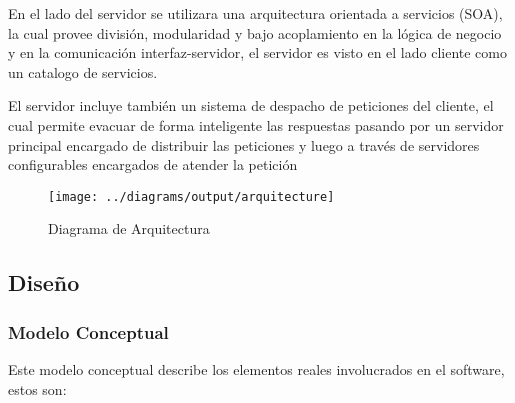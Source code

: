 En el lado del servidor se utilizara una arquitectura orientada a servicios (SOA), la cual provee división, modularidad y bajo acoplamiento en la lógica de negocio y en la comunicación interfaz-servidor, el servidor es visto en el lado cliente como un catalogo de servicios.

El servidor incluye también un sistema de despacho de peticiones del cliente, el cual permite evacuar de forma inteligente las respuestas pasando por un servidor principal encargado de distribuir las peticiones y luego a través de servidores configurables encargados de atender la petición

\begin{landscape}
\begin{figure}
 \centering
 \texttt{[image: ../diagrams/output/arquitecture]}
 \caption{Diagrama de Arquitectura}
 \label{diagrama:arquitectura}
\end{figure}
\end{landscape}


\subsection{Diseño}

\subsubsection{Modelo Conceptual}

Este modelo conceptual describe los elementos reales involucrados en el software, estos son:

